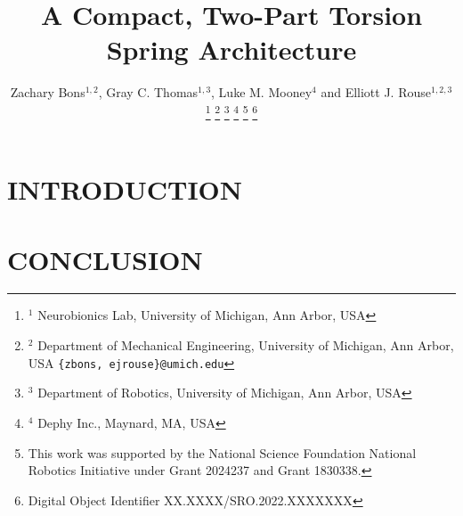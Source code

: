 \documentclass[letterpaper, 10 pt, conference]{ieeeconf} %
\title{\LARGE \bf A Compact, Two-Part Torsion Spring Architecture}
\author{Zachary Bons$^{1,2}$, Gray C. Thomas$^{1,3}$, Luke M. Mooney$^{4}$ and Elliott J. Rouse$^{1,2,3}$%
\thanks{$^{1}$ Neurobionics Lab, University of Michigan, Ann Arbor, USA}%
\thanks{$^{2}$ Department of Mechanical Engineering, University of Michigan, Ann Arbor, USA {\tt\small \{zbons, ejrouse\}@umich.edu}}%
\thanks{$^{3}$ Department of Robotics, University of Michigan, Ann Arbor, USA}%
\thanks{$^{4}$ Dephy Inc., Maynard, MA, USA}%
\thanks{This work was supported by the National Science Foundation National Robotics Initiative under Grant 2024237 and Grant 1830338.}%
\thanks{Digital Object Identifier XX.XXXX/SRO.2022.XXXXXXX}
}
\begin{document}
\maketitle
\thispagestyle{empty}
\pagestyle{empty}

\begin{abstract}



\end{abstract}


\section{INTRODUCTION}



\section{CONCLUSION}




% 
% 
\end{document}
